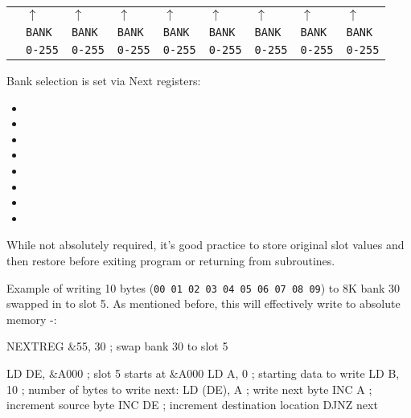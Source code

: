 \begin{tabular}{p{1.8cm}C{1.1cm}C{1.1cm}C{1.1cm}C{1.1cm}C{1.1cm}C{1.1cm}C{1.1cm}C{1.1cm}}
			& $\uparrow$		& $\uparrow$		& $\uparrow$		& $\uparrow$		& $\uparrow$		& $\uparrow$		& $\uparrow$		& $\uparrow$ \\
			& {\tt BANK}		& {\tt BANK}		& {\tt BANK}		& {\tt BANK}		& {\tt BANK}		& {\tt BANK}		& {\tt BANK}		& {\tt BANK} \\
			& {\tt 0-255}		& {\tt 0-255}		& {\tt 0-255}		& {\tt 0-255}		& {\tt 0-255}		& {\tt 0-255}		& {\tt 0-255}		& {\tt 0-255} \\
\end{tabular}

Bank selection is set via Next registers:

\begin{itemize}[topsep=0pt,itemsep=0pt]
	\item {}
	\item {}
	\item {}
	\item {}
	\item {}
	\item {}
	\item {}
	\item {}
\end{itemize}

While not absolutely required, it's good practice to store original slot values and then restore before exiting program or returning from subroutines.

Example of writing 10 bytes ({\tt 00 01 02 03 04 05 06 07 08 09}) to 8K bank 30 swapped in to slot 5. As mentioned before, this will effectively write to absolute memory -:

\begin{tcblisting}{}
	NEXTREG &55, 30     ; swap bank 30 to slot 5

	LD DE, &A000        ; slot 5 starts at &A000
	LD A, 0             ; starting data to write
	LD B, 10            ; number of bytes to write
next:
	LD (DE), A          ; write next byte
	INC A               ; increment source byte
	INC DE              ; increment destination location
	DJNZ next
\end{tcblisting}

